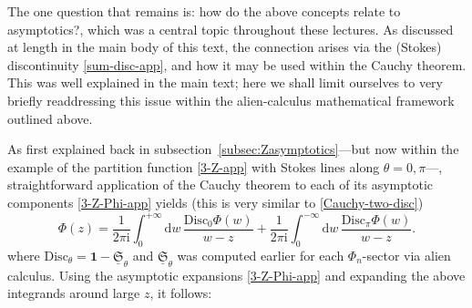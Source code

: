 \documentclass[11pt,a4paper]{article}
\newcommand{\be}{\begin{equation}}
\newcommand{\ee}{\end{equation}}
\def\1{\mathbf{1}}
\def\disc{{\mathrm{Disc}}}
\newcommand{\rmi}{{\mathrm{i}}}
\newcommand{\rmd}{{\mathrm{d}}}
\begin{document}
The one question that remains is: how do the above concepts relate to asymptotics?, which was a central topic throughout these lectures. As discussed at length in the main body of this text, the connection arises via the (Stokes) discontinuity \eqref{sum-disc-app}, and how it may be used within the Cauchy theorem. This was well explained in the main text; here we shall limit ourselves to very briefly readdressing this issue within the alien-calculus mathematical framework outlined above.

As first explained back in subsection~\ref{subsec:Zasymptotics}---but now within the example of the partition function \eqref{3-Z-app} with Stokes lines along $\theta=0, \pi$---, straightforward application of the Cauchy theorem to each of its asymptotic components \eqref{3-Z-Phi-app} yields (this is very similar to \eqref{Cauchy-two-disc})
%
\be
\Phi (z) = \frac{1}{2\pi\rmi} \int_{0}^{+\infty} \rmd w\, \frac{\disc_{0}\Phi(w)}{w-z} + \frac{1}{2\pi\rmi} \int_{0}^{-\infty} \rmd w\, \frac{\disc_{\pi}\Phi(w)}{w-z}.
\ee
%
\noindent
where $\disc_\theta = \1 - \underline{\mathfrak{S}}_\theta$ and $\underline{\mathfrak{S}}_\theta$ was computed earlier for each $\Phi_n$-sector via alien calculus. Using the asymptotic expansions \eqref{3-Z-Phi-app} and expanding the above integrands around large $z$, it follows:
%
\end{document}
